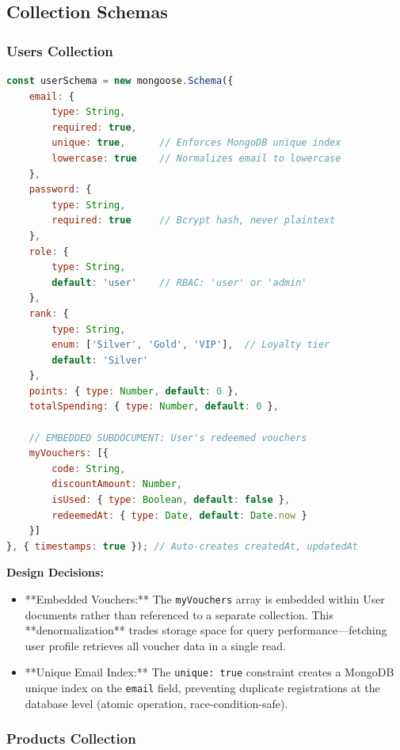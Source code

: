 \subsection{Collection Schemas}

\subsubsection{Users Collection}

\begin{lstlisting}[language=JavaScript, caption=User Schema (server.js:91-101)]
const userSchema = new mongoose.Schema({
    email: { 
        type: String, 
        required: true, 
        unique: true,      // Enforces MongoDB unique index
        lowercase: true    // Normalizes email to lowercase
    },
    password: { 
        type: String, 
        required: true     // Bcrypt hash, never plaintext
    },
    role: { 
        type: String, 
        default: 'user'    // RBAC: 'user' or 'admin'
    },
    rank: { 
        type: String, 
        enum: ['Silver', 'Gold', 'VIP'],  // Loyalty tier
        default: 'Silver' 
    },
    points: { type: Number, default: 0 },
    totalSpending: { type: Number, default: 0 },
    
    // EMBEDDED SUBDOCUMENT: User's redeemed vouchers
    myVouchers: [{
        code: String,
        discountAmount: Number,
        isUsed: { type: Boolean, default: false },
        redeemedAt: { type: Date, default: Date.now }
    }]
}, { timestamps: true }); // Auto-creates createdAt, updatedAt
\end{lstlisting}

\textbf{Design Decisions:}
\begin{itemize}
    \item **Embedded Vouchers:** The \texttt{myVouchers} array is embedded within User documents rather than referenced to a separate collection. This **denormalization** trades storage space for query performance—fetching user profile retrieves all voucher data in a single read.
    \item **Unique Email Index:** The \texttt{unique: true} constraint creates a MongoDB unique index on the \texttt{email} field, preventing duplicate registrations at the database level (atomic operation, race-condition-safe).
\end{itemize}

\subsubsection{Products Collection}

